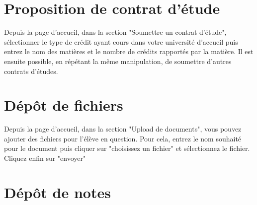 \section{Proposition de contrat d'étude}

Depuis la page d'accueil, dans la section "Soumettre un contrat d'étude", sélectionner le type de crédit ayant cours dans votre université d'accueil puis entrez le nom des matières et le nombre de crédits rapportés par la matière.
Il est ensuite possible, en répétant la même manipulation, de soumettre d'autres contrats d'études.

\section{Dépôt de fichiers}

Depuis la page d'accueil, dans la section "Upload de documents", vous pouvez ajouter des fichiers pour l'élève en question. Pour cela, entrez le nom souhaité pour le document puis cliquer sur "choisissez un fichier" et sélectionnez le fichier. Cliquez enfin sur "envoyer" 

\section{Dépôt de notes}